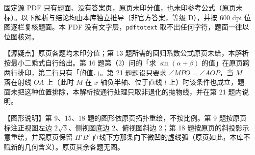 \begin{gktip}
固定源 PDF 只有题面、没有答案页，原页未印分值，也未印参考公式（原页未标）。以下解析与结论均由本库独立推导（非官方答案，等级 D），并按 600 dpi 位图逐栏复核题面。本 PDF 没有文字层，\texttt{pdftotext} 取不出任何字符，题面一律以位图核对。

【源疑点】原页各题均未印分值；第 13 题所需的回归系数公式原页未给，本解析按最小二乘式自行给出。第 16 题第（2）问的「求 $\sin(\alpha+\beta)$ 的值」在原页跨两行排印，第二行只有「的值．」。第 21 题题设只要求 $\angle MPO=\angle AOP$，当 $M$ 落在射线 $OA$ 上（此时 $M$ 在 $x$ 轴负半轴、位于直线 $l$ 上）时该条件也成立，题面未把这种位置排除，本解析按通行处理只取非退化的抛物线，并在第 21 题内说明。

【图形说明】第 9、15、18 题的图形依原页拓扑重绘，不按比例。第 9 题按原页标注正视图左边 $2\sqrt3$、侧视图底边 $2$、俯视图斜边 $2$；第 18 题按原页的斜投影示意重绘，并照原页保留 $H'B'$ 直线下方那条向下微凹的虚线弧（原页如此，本库不赋新的几何含义）。原页其余各题无图。
\end{gktip}

